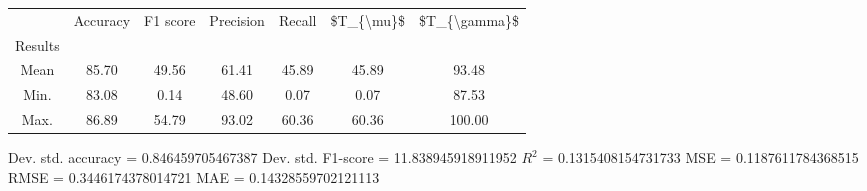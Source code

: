 \begin{tabular}{|c|c|c|c|c|c|c|}
\toprule
{} &  Accuracy &  F1 score &  Precision &  Recall &  \$T\_\{\textbackslash mu\}\$ &  \$T\_\{\textbackslash gamma\}\$ \\
Results &           &           &            &         &            &               \\
\hline
Mean    &     85.70 &     49.56 &      61.41 &   45.89 &      45.89 &         93.48 \\
Min.    &     83.08 &      0.14 &      48.60 &    0.07 &       0.07 &         87.53 \\
Max.    &     86.89 &     54.79 &      93.02 &   60.36 &      60.36 &        100.00 \\
\bottomrule
\end{tabular}

 Dev. std. accuracy = 0.846459705467387
 Dev. std. F1-score = 11.838945918911952
 $R^2$ = 0.1315408154731733
 MSE = 0.1187611784368515
 RMSE = 0.3446174378014721
 MAE = 0.14328559702121113